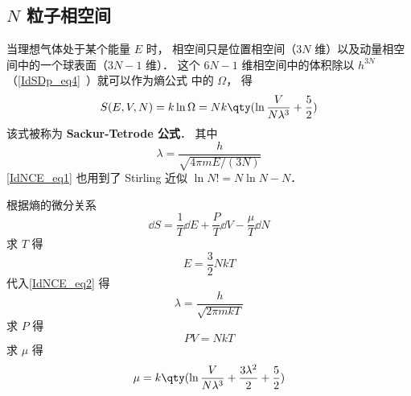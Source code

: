
\begin{issues}
\issueDraft
\end{issues}

\subsection{$N$ 粒子相空间}

当理想气体处于某个能量 $E$ 时， 相空间只是位置相空间（$3N$ 维）以及动量相空间中的一个球表面（$3N-1$ 维）． 这个 $6N - 1$ 维相空间中的体积除以 $h^{3N}$ （\autoref{IdSDp_eq4}~）就可以作为熵公式%
中的 $\Omega$， 得
\begin{equation}\label{IdNCE_eq1}
S(E, V, N) = k\ln \Omega  = Nk \qty(\ln \frac{V}{N\lambda^3} + \frac52)
\end{equation}
该式被称为 \textbf{Sackur-Tetrode 公式}． 其中
\begin{equation}\label{IdNCE_eq2}
\lambda = \frac{h}{\sqrt{4\pi mE/(3N)}}
\end{equation}
\autoref{IdNCE_eq1} 也用到了 Stirling 近似 %
$\ln N! = N\ln N - N$．

根据熵的微分关系 %
\begin{equation}
\dd{S} = \frac{1}{T} \dd{E} + \frac{P}{T} \dd{V} - \frac{\mu}{T} \dd{N}
\end{equation}
求 $T$ 得
\begin{equation}
E = \frac{3}{2}NkT
\end{equation}
代入\autoref{IdNCE_eq2} 得
\begin{equation}
\lambda = \frac{h}{\sqrt{2\pi mkT}}
\end{equation}
求 $P$ 得
\begin{equation}
PV = NkT
\end{equation}
求 $\mu$ 得
\begin{equation}
\mu = k \qty(\ln \frac{V}{N\lambda^3} + \frac{3\lambda^2}{2} + \frac52)
\end{equation}
